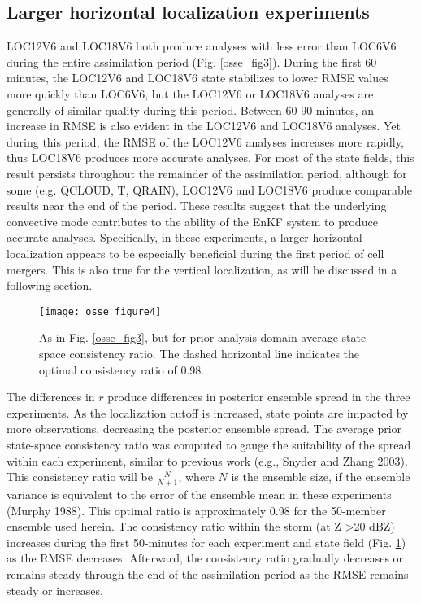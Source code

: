 \subsection{Larger horizontal localization experiments}
LOC12V6 and LOC18V6 both produce analyses with less error than LOC6V6 during the entire assimilation period (Fig. \ref{osse_fig3}). During the first 60 minutes, the LOC12V6 and LOC18V6 state stabilizes to lower RMSE values more quickly than LOC6V6, but the LOC12V6 or LOC18V6 analyses are generally of similar quality during this period. Between 60-90 minutes, an increase in RMSE is also evident in the LOC12V6 and LOC18V6 analyses. Yet during this period, the RMSE of the LOC12V6 analyses increases more rapidly, thus LOC18V6 produces more accurate analyses. For most of the state fields, this result persists throughout the remainder of the assimilation period, although for some (e.g. QCLOUD, T, QRAIN), LOC12V6 and LOC18V6 produce comparable results near the end of the period. These results suggest that the underlying convective mode contributes to the ability of the EnKF system to produce accurate analyses. Specifically, in these experiments, a larger horizontal localization appears to be especially beneficial during the first period of cell mergers. This is also true for the vertical localization, as will be discussed in a following section.

\begin{figure}
\centering
\texttt{[image: osse\_figure4]}
\caption{As in Fig. \ref{osse_fig3}, but for prior analysis domain-average state-space consistency ratio. The dashed horizontal line indicates the optimal consistency ratio of 0.98.}
\label{osse_fig4}
\end{figure}

The differences in \(r\) produce differences in posterior ensemble spread in the three experiments. As the localization cutoff is increased, state points are impacted by more observations, decreasing the posterior ensemble spread. The average prior state-space consistency ratio was computed to gauge the suitability of the spread within each experiment, similar to previous work (e.g., Snyder and Zhang 2003). This consistency ratio will be \(\frac{N}{N + 1}\), where \(N\) is the ensemble size, if the ensemble variance is equivalent to the error of the ensemble mean in these experiments (Murphy 1988). This optimal ratio is approximately 0.98 for the 50-member ensemble used herein. The consistency ratio within the storm (at Z \textgreater 20 dBZ) increases during the first 50-minutes for each experiment and state field (Fig. \ref{osse_fig4}) as the RMSE decreases. Afterward, the consistency ratio gradually decreases or remains steady through the end of the assimilation period as the RMSE remains steady or increases. 

